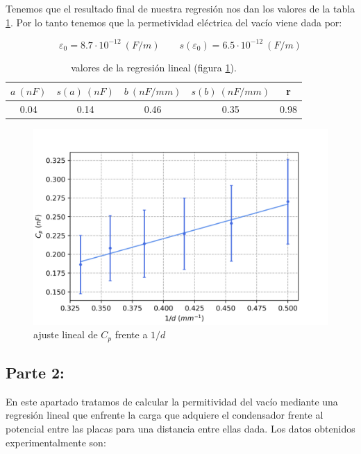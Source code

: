 \documentclass[12pt,a4paper]{article}
\begin{document}
Tenemos que el resultado final de nuestra regresión nos dan los valores de la tabla \ref{tab:regresion1}. Por lo tanto tenemos que la permetividad eléctrica del vacío viene dada por:

\begin{equation}
\varepsilon_0 = 8.7 \cdot 10^{-12} \ (F/m) \quad \quad s(\varepsilon_0)=6.5 \cdot 10^{-12} \ (F/m)
\end{equation}

\begin{table}[h!] 	 \centering 
\begin{tabular}{|c|c|c|c|c|} 
\hline 
$a \ (nF)$ & $s(a) \ (nF)$ & $ b \ (nF/mm)$ & $s(b) \ (nF/mm) $ & r  \\ \hline 
0.04  & 0.14 &  0.46 & 0.35 & 0.98 \\ 
\hline
\end{tabular} 
\caption{valores de la regresión lineal (figura \ref{Fig:regresion1}).} 
\label{tab:regresion1} 
\end{table} 
 


\begin{figure}[h!] \centering
\includegraphics[scale=1]{plot1.png}
\caption{ajuste lineal de $C_p$ frente a $1/d$}
\label{Fig:regresion1}
\end{figure}
 
\newpage
 
\subsection{Parte 2:}

En este apartado tratamos de calcular la permitividad del vacío mediante una regresión lineal que enfrente la carga que adquiere el condensador frente al potencial entre las placas para una distancia entre ellas dada. Los datos obtenidos experimentalmente son:
\end{document}
